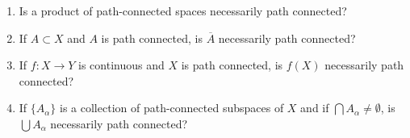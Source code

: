 %
\begin{exercise}[ID=3.24.8]
  \begin{enumerate}[label={(\alph*)}, align=left, leftmargin=\parindent, listparindent=\parindent, labelwidth=0pt, itemindent=!]
    \item
    Is a product of path-connected spaces necessarily path connected?
    \item
      If $A \subset X$ and $A$ is path connected, is $\overline{A}$ necessarily path connected?
    \item 
      If $f: X \rightarrow Y$ is continuous and $X$ is path connected, is $f(X)$ necessarily path connected?
    \item 
      If $\{A_\alpha\}$ is a collection of path-connected subspaces of $X$ and if $\bigcap A_\alpha \neq \emptyset$, is $\bigcup A_\alpha$ necessarily path connected?
    \end{enumerate}
\end{exercise}
%
